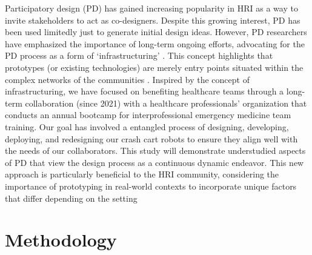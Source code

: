 Participatory design (PD) has gained increasing popularity in HRI as a way to invite stakeholders to act as co-designers. %
 Despite this growing interest, PD has been used limitedly just to generate initial design ideas. 
However, PD researchers have emphasized the importance of long-term ongoing efforts, advocating for the PD process as a form of `infrastructuring' \cite{bjorgvinsson2010participatory}. 
This concept highlights that prototypes (or existing technologies) are merely entry points situated within the complex networks of the communities \cite{suchman2002located, star1994steps}. %
Inspired by the concept of infrastructuring, we have focused on benefiting healthcare teams through a long-term collaboration (since 2021) with a healthcare professionals’ organization that conducts an annual bootcamp for interprofessional emergency medicine team training. 
Our goal has involved a entangled process of designing, developing, deploying, and redesigning our crash cart robots to ensure they align well with the needs of our collaborators. This study will demonstrate understudied aspects of PD that view the design process as a continuous dynamic endeavor. 
This new approach is particularly beneficial to the HRI community, considering the importance of prototyping in real-world contexts to incorporate unique factors that differ depending on the setting \cite{lee2010gracefully} %



%
\section{Methodology}
          

